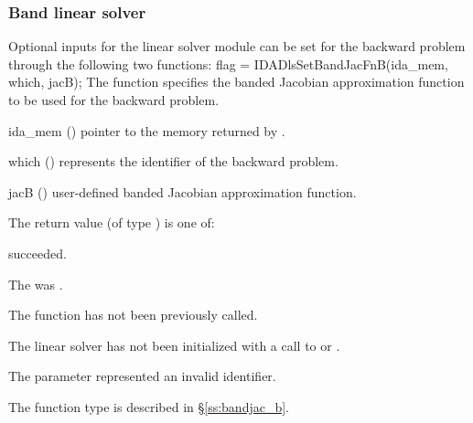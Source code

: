 \subsubsection{Band linear solver}
Optional inputs for the {\idaband} linear solver module can be set for the backward
problem through the following two functions:
{
  flag = IDADlsSetBandJacFnB(ida\_mem, which, jacB);
}
{
  The function  specifies the banded Jacobian
  approximation function to be used for the backward problem.
}
{
  \begin{args}
  \item[ida\_mem] ()
    pointer to the {\idas} memory returned by .
  \item[which] ()
    represents the identifier of the backward problem.
  \item[jacB] ()
    user-defined banded Jacobian approximation function.
  \end{args}
}
{
  The return value  (of type ) is one of:
  \begin{args}
  \item[\Id{IDADLS\_SUCCESS}] 
     succeeded.
  \item[\Id{IDADLS\_MEM\_NULL}]
    The  was .
  \item[\Id{IDADLS\_NO\_ADJ}]
    The function  has not been previously called.
  \item[\Id{IDADLS\_LMEM\_NULL}]
    The linear solver has not been initialized with a call to  or
    .
  \item[\Id{IDADLS\_ILL\_INPUT}]
    The parameter  represented an invalid identifier.
  \end{args}
}
{
  The function type  is described in \S\ref{ss:bandjac_b}.
}

